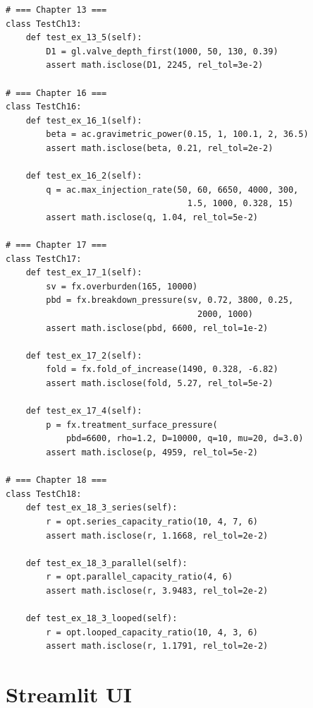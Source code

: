 \documentclass[10pt,a4paper,openany]{book}
\begin{document}
\begin{lstlisting}
# === Chapter 13 ===
class TestCh13:
    def test_ex_13_5(self):
        D1 = gl.valve_depth_first(1000, 50, 130, 0.39)
        assert math.isclose(D1, 2245, rel_tol=3e-2)

# === Chapter 16 ===
class TestCh16:
    def test_ex_16_1(self):
        beta = ac.gravimetric_power(0.15, 1, 100.1, 2, 36.5)
        assert math.isclose(beta, 0.21, rel_tol=2e-2)

    def test_ex_16_2(self):
        q = ac.max_injection_rate(50, 60, 6650, 4000, 300,
                                    1.5, 1000, 0.328, 15)
        assert math.isclose(q, 1.04, rel_tol=5e-2)

# === Chapter 17 ===
class TestCh17:
    def test_ex_17_1(self):
        sv = fx.overburden(165, 10000)
        pbd = fx.breakdown_pressure(sv, 0.72, 3800, 0.25,
                                      2000, 1000)
        assert math.isclose(pbd, 6600, rel_tol=1e-2)

    def test_ex_17_2(self):
        fold = fx.fold_of_increase(1490, 0.328, -6.82)
        assert math.isclose(fold, 5.27, rel_tol=5e-2)

    def test_ex_17_4(self):
        p = fx.treatment_surface_pressure(
            pbd=6600, rho=1.2, D=10000, q=10, mu=20, d=3.0)
        assert math.isclose(p, 4959, rel_tol=5e-2)

# === Chapter 18 ===
class TestCh18:
    def test_ex_18_3_series(self):
        r = opt.series_capacity_ratio(10, 4, 7, 6)
        assert math.isclose(r, 1.1668, rel_tol=2e-2)

    def test_ex_18_3_parallel(self):
        r = opt.parallel_capacity_ratio(4, 6)
        assert math.isclose(r, 3.9483, rel_tol=2e-2)

    def test_ex_18_3_looped(self):
        r = opt.looped_capacity_ratio(10, 4, 3, 6)
        assert math.isclose(r, 1.1791, rel_tol=2e-2)
\end{lstlisting}

\part{Streamlit UI}
\end{document}
